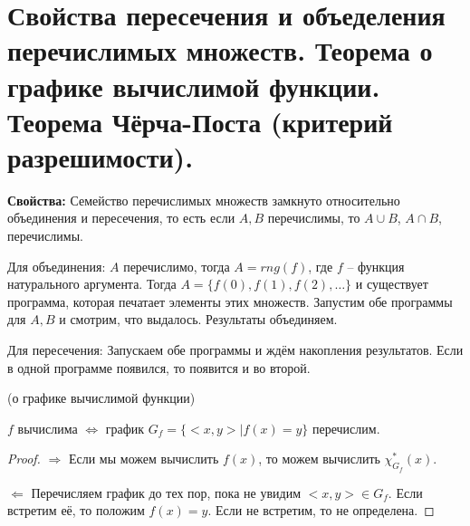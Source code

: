 \section{Свойства пересечения и объеделения перечислимых множеств. Теорема о графике вычислимой функции. Теорема Чёрча-Поста (критерий разрешимости).}
\begin{quote*}{\textbf{Свойства: }}
Семейство перечислимых множеств замкнуто относительно объединения и пересечения, то есть если $A, B$ перечислимы, то $A \cup B$, $A \cap B$, перечислимы.
\par Для объединения: $A$ перечислимо, тогда $A=rng(f)$, где $f$ -- функция натурального аргумента. Тогда $A = \{ f(0), f(1), f(2), \dots \}$ и существует программа, которая печатает элементы этих множеств. Запустим обе программы для $A, B$ и смотрим, что выдалось. Результаты объединяем.
\par Для пересечения: Запускаем обе программы и ждём накопления результатов. Если в одной программе появился, то появится и во второй.
\end{quote*}
\begin{theorem}{(о графике вычислимой функции)}
\par$f$ вычислима $\iff$ график $G_{f} = \{<x,y> | f(x) = y\}$ перечислим.
\begin{proof}
\par $\Longrightarrow$ Если мы можем вычислить $f(x)$, то можем вычислить $\chi^*_{G_f}(x)$.
\par $\Longleftarrow$ Перечисляем график до тех пор, пока не увидим $<x,y> \in G_{f}$. Если встретим её, то положим $f(x) = y$. Если не встретим, то не определена.
\end{proof}
\end{theorem}
